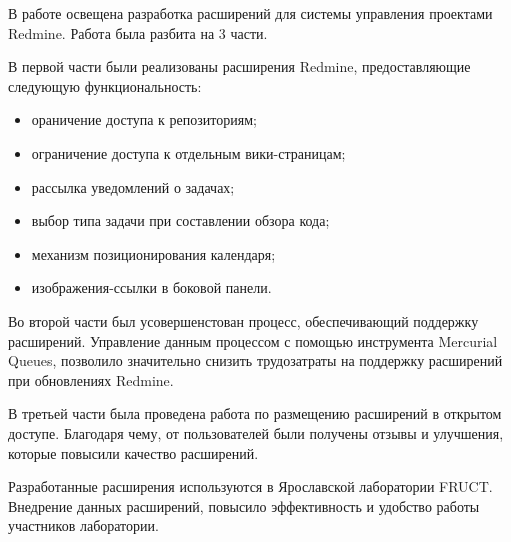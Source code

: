 
В работе освещена разработка расширений для системы управления проектами
Redmine. Работа была разбита на 3 части.

В первой части были реализованы расширения Redmine, предоставляющие
следующую функциональность:
\begin{itemize}
  \item ораничение доступа к репозиториям;
  \item ограничение доступа к отдельным вики-страницам;
  \item рассылка уведомлений о задачах; 
  \item выбор типа задачи при составлении обзора кода;
  \item механизм позиционирования календаря;
  \item изображения-ссылки в боковой панели.
\end{itemize}

Во второй части был усовершенстован процесс, обеспечивающий поддержку
расширений. Управление данным процессом с помощью инструмента Mercurial Queues,
позволило значительно снизить трудозатраты на поддержку расширений при
обновлениях Redmine.

В третьей части была проведена работа по размещению расширений в открытом
доступе. Благодаря чему, от пользователей были получены отзывы и улучшения,
которые повысили качество расширений.

Разработанные расширения используются в Ярославской лаборатории FRUCT.
Внедрение данных расширений, повысило эффективность и удобство работы
участников лаборатории.



